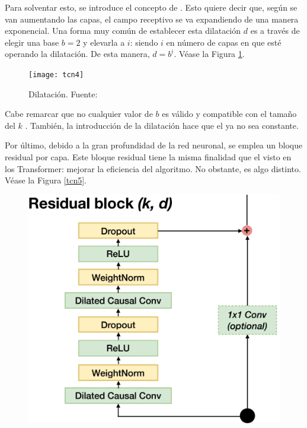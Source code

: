 {Para solventar esto, se introduce el concepto de  \parencite{waveNet}. Esto quiere decir que, según se van aumentando las capas, el campo receptivo se va expandiendo de una manera exponencial. Una forma muy común de establecer esta dilatación $d$ es a través de elegir una base $b = 2$ y elevarla a $i$: siendo $i$ en número de capas en que esté operando la dilatación. De esta manera, $d = b^i$.  Véase la Figura \ref{tcn4}.

\begin{figure}[H]
    \centering
    \hspace{-3cm}
    \texttt{[image: tcn4]}
    \caption{Dilatación. \scriptsize{Fuente: \parencite{waveNet}}}
    \label{tcn4}
\end{figure}

Cabe remarcar que no cualquier valor de $b$ es válido y compatible con el tamaño del  $k$ \parencite{TCNpost}. También, la introducción de la dilatación hace que el  ya no sea constante.

Por último, debido a la gran profundidad de la red neuronal, se emplea un bloque residual por capa. Este bloque residual \parencite{bloqueResidual} tiene la misma finalidad que el visto en los Transformer: mejorar la eficiencia del algoritmo. No obstante, es algo distinto. Véase la Figura \ref{tcn5}.

\begin{figure}[H]
    \centering
    \includegraphics[scale = 0.35]{imgs/tcn5.png}
\end{figure}}

